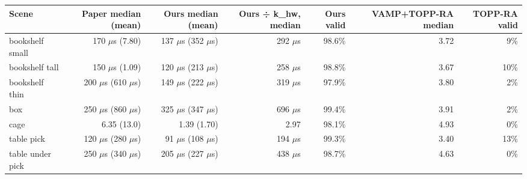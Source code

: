 \documentclass[border=4pt]{standalone}
\begin{document}
\begin{tabular}{lrrrrrr}
\toprule
\textbf{Scene} & \textbf{Paper median (mean)} & \textbf{Ours median (mean)} & \textbf{Ours ÷ k\_hw, median} & \textbf{Ours valid} & \textbf{VAMP+TOPP-RA median} & \textbf{TOPP-RA valid} \\
\midrule
bookshelf small & 170 $\mu$s (7.80) & 137 $\mu$s (352 $\mu$s) & 292 $\mu$s & 98.6\% & 3.72 & 9\% \\
bookshelf tall & 150 $\mu$s (1.09) & 120 $\mu$s (213 $\mu$s) & 258 $\mu$s & 98.8\% & 3.67 & 10\% \\
bookshelf thin & 200 $\mu$s (610 $\mu$s) & 149 $\mu$s (222 $\mu$s) & 319 $\mu$s & 97.9\% & 3.80 & 2\% \\
box & 250 $\mu$s (860 $\mu$s) & 325 $\mu$s (347 $\mu$s) & 696 $\mu$s & 99.4\% & 3.91 & 2\% \\
cage & 6.35 (13.0) & 1.39 (1.70) & 2.97 & 98.1\% & 4.93 & 0\% \\
table pick & 120 $\mu$s (280 $\mu$s) & 91 $\mu$s (108 $\mu$s) & 194 $\mu$s & 99.3\% & 3.40 & 13\% \\
table under pick & 250 $\mu$s (340 $\mu$s) & 205 $\mu$s (227 $\mu$s) & 438 $\mu$s & 98.7\% & 4.63 & 0\% \\
\bottomrule
\end{tabular}
\end{document}

